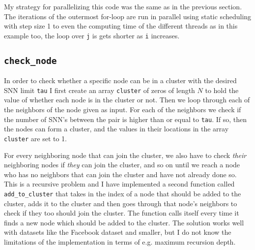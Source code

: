\documentclass[reprint, english,notitlepage,nofootinbib]{revtex4-1}  %
\begin{document}
My strategy for parallelizing this code was the same as in the previous section. The iterations of the outermost for-loop are run in parallel using static scheduling with step size 1 to even the computing time of the different threads as in this example too, the loop over \verb|j| is gets shorter as \verb|i| increases.


\subsection{\texttt{check\_node}}

In order to check whether a specific node can be in a cluster with the desired SNN limit \verb|tau| I first create an array \verb|cluster| of zeros of length \(N\) to hold the value of whether each node is in the cluster or not. Then we loop through each of the neighbors of the node given as input. For each of the neighbors we check if the number of SNN's between the pair is higher than or equal to \verb|tau|. If so, then the nodes can form a cluster, and the values in their locations in the array \verb|cluster| are set to 1.

For every neighboring node that can join the cluster, we also have to check \textit{their} neighboring nodes if \textit{they} can join the cluster, and so on until we reach a node who has no neighbors that can join the cluster and have not already done so. This is a recursive problem and I have implemented a second function called \verb|add_to_cluster| that takes in the index of a node that should be added to the cluster, adds it to the cluster and then goes through that node's neighbors to check if they too should join the cluster. The function calls itself every time it finds a new node which should be added to the cluster. The solution works well with datasets like the Facebook dataset and smaller, but I do not know the limitations of the implementation in terms of e.g. maximum recursion depth. 



\onecolumngrid
\vspace{1cm} %
\newpage

% 
\end{document}
